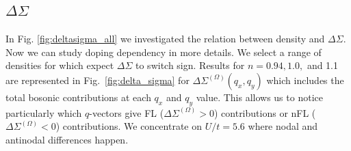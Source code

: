 \subsection{$\Delta\Sigma$}

In Fig. \ref{fig:deltasigma_all} we investigated the relation between density and $\Delta \Sigma$. Now we can study doping dependency in more details. We select a range of densities for which expect $\Delta \Sigma$ to switch sign. Results for $n=0.94, 1.0,$ and 1.1 are represented in Fig.~\ref{fig:delta_sigma} for $\Delta \Sigma^{(\Omega)}(q_x,q_y)$ which includes the total bosonic contributions at each $q_x$ and $q_y$ value.  
This allows us to notice particularly which $q$-vectors give FL ($\Delta \Sigma^{(\Omega)}>0$) contributions or nFL  ($\Delta \Sigma^{(\Omega)}<0$) contributions.  We concentrate on $U/t=5.6$ where nodal and antinodal differences happen. 

